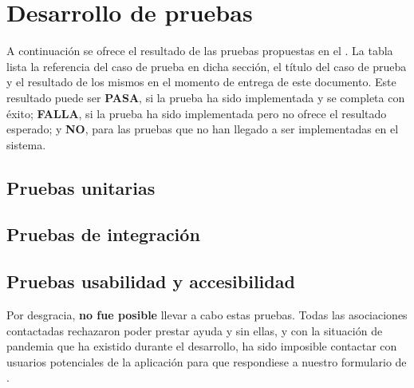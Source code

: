 \chapter{Desarrollo de pruebas}
\label{ch:desarrollo_pruebas}

A continuación se ofrece el resultado de las pruebas propuestas en el . La tabla lista la referencia del caso de prueba en dicha sección, el título del caso de prueba y el resultado de los mismos en el momento de entrega de este documento. Este resultado puede ser \textbf{PASA}, si la prueba ha sido implementada y se completa con éxito; \textbf{FALLA}, si la prueba ha sido implementada pero no ofrece el resultado esperado; y \textbf{NO}, para las pruebas que no han llegado a ser implementadas en el sistema.

\section{Pruebas unitarias}




\section{Pruebas de integración}




\section{Pruebas usabilidad y accesibilidad}

Por desgracia, \textbf{no fue posible} llevar a cabo estas pruebas. Todas las asociaciones contactadas rechazaron poder prestar ayuda y sin ellas, y con la situación de pandemia que ha existido durante el desarrollo, ha sido imposible contactar con usuarios potenciales de la aplicación para que respondiese a nuestro formulario de .